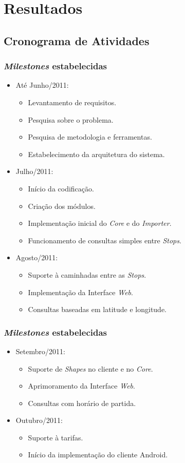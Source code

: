 \section{Resultados}

\subsection{Cronograma de Atividades}
\frame
{
\frametitle{\emph{Milestones} estabelecidas}
\begin{itemize}
	\item Até Junho/2011:
	\begin{itemize}
		\item Levantamento de requisitos.
		\item Pesquisa sobre o problema.
		\item Pesquisa de metodologia e ferramentas.
		\item Estabelecimento da arquitetura do sistema.
	\end{itemize}
	\item Julho/2011:
	\begin{itemize}
		\item Início da codificação.
		\item Criação dos módulos.
		\item Implementação inicial do \emph{Core} e do \emph{Importer}.
		\item Funcionamento de consultas simples entre \emph{Stops}.
	\end{itemize}
	\item Agosto/2011:
	\begin{itemize}
		\item Suporte à caminhadas entre as \emph{Stops}.
		\item Implementação da Interface \emph{Web}.
		\item Consultas baseadas em latitude e longitude.
	\end{itemize}
\end{itemize}
}
\frame
{
\frametitle{\emph{Milestones} estabelecidas}
\begin{itemize}
	\item Setembro/2011:
	\begin{itemize}
		\item Suporte de \emph{Shapes} no cliente e no \emph{Core}.
		\item Aprimoramento da Interface \emph{Web}.
		\item Consultas com horário de partida.
	\end{itemize}
	\item Outubro/2011:
	\begin{itemize}
		\item Suporte à tarifas.
		\item Início da implementação do cliente Android.
	\end{itemize}
\end{itemize}
}

